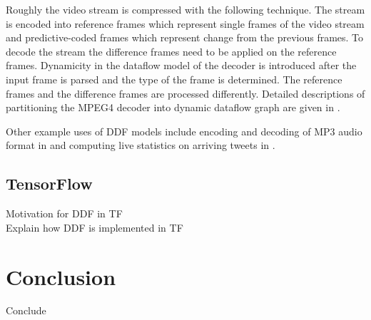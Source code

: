 \documentclass[conference,a4paper]{IEEEtran}
\begin{document}
Roughly the video stream is compressed with the following technique. The stream
is encoded into reference frames which represent single frames of the video
stream and predictive-coded frames which represent change from the previous
frames. To decode the stream the difference frames need to be applied on the
reference frames. Dynamicity in the dataflow model of the decoder is introduced
after the input frame is parsed and the type of the frame is determined. The
reference frames and the difference frames are processed differently. Detailed
descriptions of partitioning the MPEG4 decoder into dynamic dataflow graph are
given in \cite{eker2003cal, roquier2008automatic}.

Other example uses of DDF models include encoding and decoding of MP3 audio
format in \cite{bhattacharyya2013handbook} and computing live statistics on
arriving tweets in \cite{murray2013naiad}.

\subsection{TensorFlow}
Motivation for DDF in TF \\
Explain how DDF is implemented in TF \\

\section{Conclusion}
Conclude \\



\end{document}
